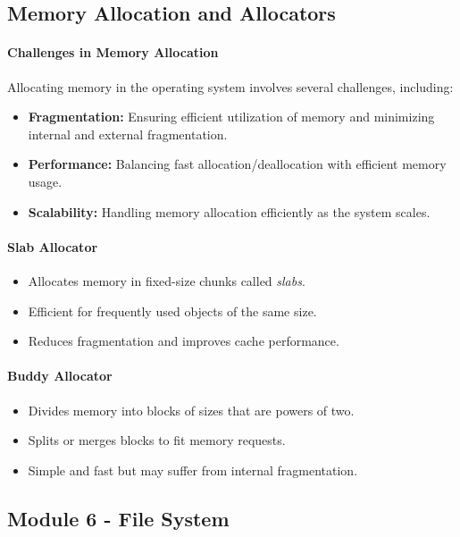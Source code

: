 \documentclass{article}
\begin{document}
\subsection{Memory Allocation and Allocators}

\paragraph{Challenges in Memory Allocation}
Allocating memory in the operating system involves several challenges, including:
\begin{itemize}
    \item \textbf{Fragmentation:} Ensuring efficient utilization of memory and minimizing internal and external fragmentation.
    \item \textbf{Performance:} Balancing fast allocation/deallocation with efficient memory usage.
    \item \textbf{Scalability:} Handling memory allocation efficiently as the system scales.
\end{itemize}

\paragraph{Slab Allocator}
\begin{itemize}
    \item Allocates memory in fixed-size chunks called \textit{slabs}.
    \item Efficient for frequently used objects of the same size.
    \item Reduces fragmentation and improves cache performance.
\end{itemize}

\paragraph{Buddy Allocator}
\begin{itemize}
    \item Divides memory into blocks of sizes that are powers of two.
    \item Splits or merges blocks to fit memory requests.
    \item Simple and fast but may suffer from internal fragmentation.
\end{itemize}


\subsection{Module 6 - File System}
\end{document}
